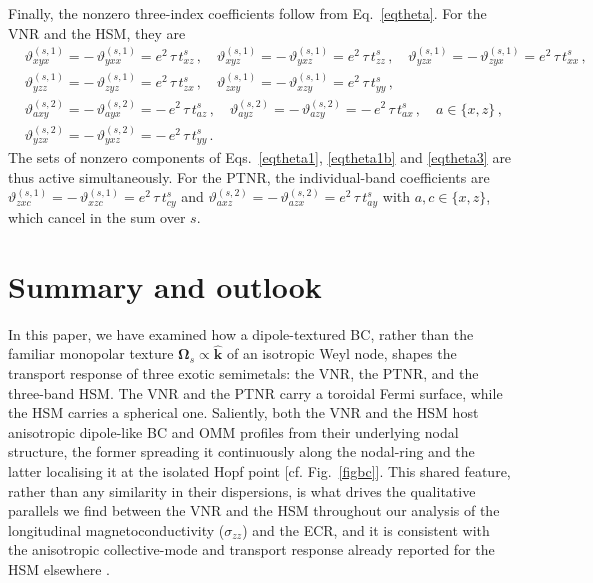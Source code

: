 \documentclass[aps,prb,onecolumn,nofootinbib,citeautoscript,10pt]{revtex4-2}
\newcommand{\bs}[1]{\boldsymbol{#1}}
\def \nn{\nonumber \\}
\begin{document}
Finally, the nonzero three-index coefficients follow from Eq.~\eqref{eqtheta}. For the VNR and the HSM, they are
\begin{align}
\label{eqthetacomb}
& \vartheta^{(s,1)}_{xyx} = -\,\vartheta^{(s,1)}_{yxx} = e^2\,\tau\,t^s_{xz}\,, \quad
\vartheta^{(s,1)}_{xyz} = -\,\vartheta^{(s,1)}_{yxz} = e^2\,\tau\,t^s_{zz}\,, \quad
\vartheta^{(s,1)}_{yzx} = -\,\vartheta^{(s,1)}_{zyx} = e^2\,\tau\,t^s_{xx}\,, \nn &
\vartheta^{(s,1)}_{yzz} = -\,\vartheta^{(s,1)}_{zyz} = e^2\,\tau\,t^s_{zx}\,, \quad
\vartheta^{(s,1)}_{zxy} = -\,\vartheta^{(s,1)}_{xzy} = e^2\,\tau\,t^s_{yy}\,, \nn &
\vartheta^{(s,2)}_{axy} = -\,\vartheta^{(s,2)}_{ayx} = -\,e^2\,\tau\,t^s_{az}\,, \quad
\vartheta^{(s,2)}_{ayz} = -\,\vartheta^{(s,2)}_{azy} = -\,e^2\,\tau\,t^s_{ax}\,, \quad a\in\{x,z\}\,, \nn &
\vartheta^{(s,2)}_{yzx} = -\,\vartheta^{(s,2)}_{yxz} = -\,e^2\,\tau\,t^s_{yy}\,.
\end{align}
The sets of nonzero components of Eqs.~\eqref{eqtheta1}, \eqref{eqtheta1b} and \eqref{eqtheta3} are thus active simultaneously. For the PTNR, the individual-band coefficients are $\vartheta^{(s,1)}_{zxc}=-\,\vartheta^{(s,1)}_{xzc}=e^2\,\tau\,t^s_{cy}$ and $\vartheta^{(s,2)}_{axz}=-\,\vartheta^{(s,2)}_{azx}=e^2\,\tau\,t^s_{ay}$ with $a,c\in\{x,z\}$, which cancel in the sum over $s$.


\section{Summary and outlook}
\label{secsum}

In this paper, we have examined how a dipole-textured BC, rather than the familiar monopolar texture $\bs\Omega_s \propto \hat{\bs k}$ of an isotropic Weyl node, shapes the transport response of three exotic semimetals: the VNR, the PTNR, and the three-band HSM. The VNR and the PTNR carry a toroidal Fermi surface, while the HSM carries a spherical one. Saliently, both the VNR and the HSM host anisotropic dipole-like BC and OMM profiles from their underlying nodal structure, the former spreading it continuously along the nodal-ring and the latter localising it at the isolated Hopf point [cf. Fig.~\ref{figbc}]. This shared feature, rather than any similarity in their dispersions, is what drives the qualitative parallels we find between the VNR and the HSM throughout our analysis of the longitudinal magnetoconductivity ($\sigma_{zz}$) and the ECR, and it is consistent with the anisotropic collective-mode and transport response already reported for the HSM elsewhere \cite{hopf-plasmon}.
\end{document}
